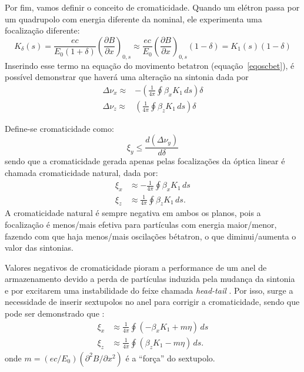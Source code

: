 Por fim, vamos definir o conceito de cromaticidade. Quando um elétron passa por um quadrupolo com energia diferente da nominal, ele experimenta uma focalização diferente:
\begin{equation}
  K_\delta(s)=\frac{ec}{E_0(1+\delta)}\left(\frac{\partial B}{\partial
x}\right)_{0,s} \approx \frac{ec}{E_0}\left(\frac{\partial B}{\partial
x}\right)_{0,s}(1-\delta) = K_1(s)(1 - \delta) 
\end{equation}
Inserindo esse termo na equação do movimento betatron \mbox{(equação \ref{eqoscbet})}, é possível demonstrar \cite{Lee, Wiedemann3} que haverá uma alteração na sintonia dada por
\begin{align}
 \Delta \nu_x \approx&-\left(\frac{1}{4\pi}\oint\beta_x K_1\,ds\right)\delta \\
 \Delta \nu_z \approx&\left(\frac{1}{4\pi}\oint\beta_z K_1\,ds\right)\delta
\end{align}

Define-se cromaticidade como: 
\begin{equation}\label{eqcromaticidade}
 \xi_y \leq \frac{d (\Delta \nu_y)}{d \delta}
\end{equation}
sendo que a cromaticidade gerada apenas pelas focalizações da óptica linear é chamada cromaticidade natural, dada por:
\begin{align}
 \xi_x &\approx -\frac{1}{4 \pi} \oint \beta_x K_1\, d s  \\
 \xi_z &\approx \frac{1}{4 \pi} \oint \beta_z K_1\, d s.
\end{align}
A cromaticidade natural é sempre negativa em ambos os planos, pois a focalização é menos/mais efetiva para partículas com energia maior/menor, fazendo com que haja menos/mais oscilações bétatron, o que diminui/aumenta o valor das sintonias.

Valores negativos de cromaticidade pioram a performance de um anel de armazenamento devido a perda de partículas induzida pela mudança da sintonia e por excitarem uma instabilidade do feixe chamada \textit{head-tail} \cite{Wiedemann3}. Por isso, surge a necessidade de inserir sextupolos no anel para corrigir a cromaticidade, sendo que pode ser demonstrado que \cite{Wiedemann3}:
\begin{align}
 \xi_x &\approx\frac{1}{4 \pi} \oint(- \beta_x K_1+m\eta)\, d s \\
 \xi_z &\approx\frac{1}{4 \pi} \oint (\beta_z K_1-m\eta)\, d s.
\end{align}
onde $m=(ec/E_0)(\partial^2B/\partial x^2)$ é a ``força'' do sextupolo.

